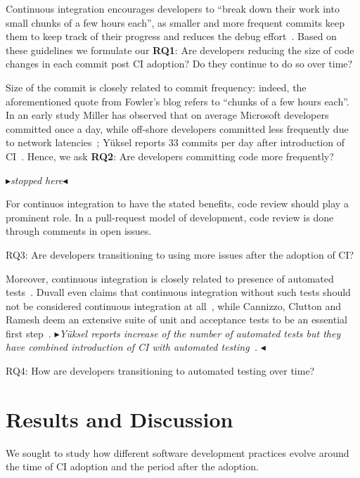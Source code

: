\documentclass[conference]{IEEEtran}
\newcommand{\nnbb}[2]{
    \fbox{\bfseries\sffamily\scriptsize#1}
    {\sf\small$\blacktriangleright$\textit{#2}$\blacktriangleleft$}
   }
\newcommand{\as}[1]{\nnbb{Alexander}{#1}}
\begin{document}
Continuous integration encourages developers to ``break down their work into small chunks of a few hours each'', as smaller and more frequent commits keep them to keep track of their progress and reduces the debug effort~\cite{Fowler,Duvall}. %
Based on these guidelines we formulate our \textbf{RQ1}: Are developers reducing the size of code changes in each commit post CI adoption? Do they continue to do so over time?

Size of the commit is closely related to commit frequency: indeed, the aforementioned quote from Fowler's blog refers to ``chunks of a few hours each''. In an early study Miller has observed that on average Microsoft developers committed once a day, while off-shore developers committed less frequently due to network latencies~\cite{Miller}; Y\"{u}ksel reports 33 commits per day after introduction of CI~\cite{Yuksel}. 
Hence, we ask \textbf{RQ2}: Are developers committing code more frequently?
\as{stopped here}
For continuos integration to have the stated benefits, code review should play a prominent role. In a pull-request model of development, code review is done through comments in open issues.

RQ3: Are developers transitioning to using more issues after the adoption of CI?


Moreover, continuous integration is closely related to presence of automated tests~\cite{Fowler}. Duvall even claims that continuous integration without such tests should not be considered continuous integration at all~\cite{Duvall}, while Cannizzo, Clutton and Ramesh deem an extensive suite of unit and acceptance tests to be an essential first step~\cite{CannizzoCluttonRamesh}. \as{Y\"{u}ksel reports increase of the number of automated tests but they have combined introduction of CI with automated testing~\cite{Yuksel}. }

RQ4: How are developers transitioning to automated testing over time?





\section{Results and Discussion}

We sought to study how different software development practices evolve around the time of CI adoption and the period after the adoption.
\end{document}
